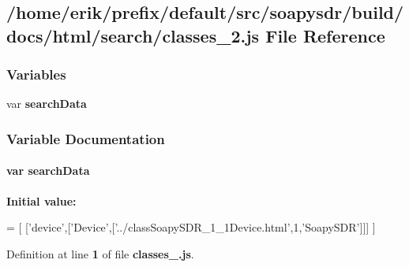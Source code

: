 \subsection{/home/erik/prefix/default/src/soapysdr/build/docs/html/search/classes\+\_\+2.js File Reference}
\label{classes__2_8js}
\subsubsection*{Variables}
\begin{DoxyCompactItemize}
\item 
var {\bf search\+Data}
\end{DoxyCompactItemize}


\subsubsection{Variable Documentation}
\paragraph[{search\+Data}]{\setlength{\rightskip}{0pt plus 5cm}var search\+Data}\label{classes__2_8js_ad01a7523f103d6242ef9b0451861231e}
{\bfseries Initial value\+:}
\begin{DoxyCode}
=
[
  [\textcolor{stringliteral}{'device'},[\textcolor{stringliteral}{'Device'},[\textcolor{stringliteral}{'../classSoapySDR\_1\_1Device.html'},1,\textcolor{stringliteral}{'SoapySDR'}]]]
]
\end{DoxyCode}


Definition at line {\bf 1} of file {\bf classes\+\_.\+js}.

